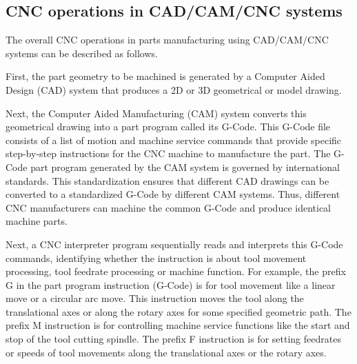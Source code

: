 
%


\clearpage
\pagebreak
\subsection{CNC operations in CAD/CAM/CNC systems}

The overall CNC operations in parts manufacturing using CAD/CAM/CNC systems can be described as follows. 
\vspace*{1\baselineskip}

First, the part geometry to be machined is generated by a Computer Aided Design (CAD) system that produces a 2D or 3D geometrical or model drawing. 
\vspace*{1\baselineskip}

Next, the Computer Aided Manufacturing (CAM) system converts this geometrical drawing into a part program called its G-Code. This G-Code file consists of a list of motion and machine service commands that provide specific step-by-step instructions for the CNC machine to manufacture the part. The G-Code part program generated by the CAM system is governed by international standards. This standardization ensures that different CAD drawings can be converted to a standardized G-Code by different CAM systems. Thus, different CNC manufacturers can machine the common G-Code and produce identical machine parts.
\vspace*{1\baselineskip}
	
Next, a CNC interpreter program sequentially reads and interprets this G-Code commands, identifying whether the instruction is about tool movement processing, tool feedrate processing or machine function. For example, the prefix G in the part program instruction (G-Code) is for tool movement like a linear move or a circular arc move. This instruction moves the tool along the translational axes or along the rotary axes for some specified geometric path. The prefix M instruction is for controlling machine service functions like the start and stop of the tool cutting spindle. The prefix F instruction is for setting feedrates or speeds of tool movements along the translational axes or the rotary axes. 
\vspace*{1\baselineskip}

